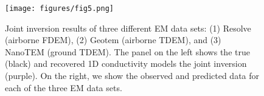 \begin{figure}
    \begin{center}
    \texttt{[image: figures/fig5.png]}
    \end{center}
\caption{
    Joint inversion results of three different EM data sets:
    (1) Resolve (airborne FDEM), (2) Geotem (airborne TDEM), and (3) NanoTEM (ground TDEM).
    The panel on the left shows the true (black) and recovered 1D conductivity models the joint inversion (purple).
    On the right, we show the observed and predicted data for each of the three EM data sets.
}
\label{fig:joint-inversion}
\end{figure}


